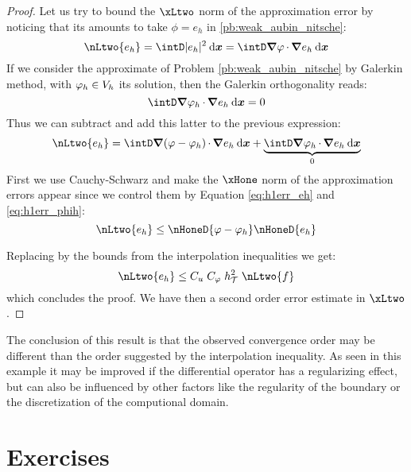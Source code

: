 \begin{proof}
\medskip
Let us try to bound the $\xLtwo$ norm of the approximation error by noticing that its amounts to take $\phi = e_h$ in \eqref{pb:weak_aubin_nitsche}:
\begin{equation*}
\nLtwo{e_h} = \intD |e_h|^2 \dxx = \intD \Grad \varphi\xDot \Grad e_h\dxx
\end{equation*}
If we consider the approximate of Problem \eqref{pb:weak_aubin_nitsche} by Galerkin method, with $\varphi_h \in {{V}}_h$ its solution, then the Galerkin orthogonality reads:
\begin{equation*}
\intD \Grad \varphi_h\xDot \Grad e_h\dxx  = 0
\end{equation*}
Thus we can subtract and add this latter to the previous expression:
\begin{equation*}
\nLtwo{e_h} = \intD \Grad (\varphi - \varphi_h)\xDot \Grad e_h\dxx + \underbrace{\intD \Grad \varphi_h\xDot \Grad e_h\dxx}_{0}
\end{equation*}
First we use Cauchy-Schwarz and make the $\xHone$ norm of the approximation errors appear since we control them by Equation \eqref{eq:h1err_eh} and \eqref{eq:h1err_phih}:
\begin{equation*}
\nLtwo{e_h} \leq \nHoneD{\varphi - \varphi_h} \nHoneD{e_h}
\end{equation*}

\medskip
Replacing by the bounds from the interpolation inequalities we get:
\begin{equation*}
\nLtwo{e_h} \leq C_u\;C_\varphi\;\sizeT^2\;\nLtwo{f}
\end{equation*}
which concludes the proof. We have then a second order error estimate in $\xLtwo$.
\end{proof}

The conclusion of this result is that the observed convergence order may be different than the order suggested by the interpolation inequality.
As seen in this example it may be improved if the differential operator has a regularizing effect, but can also be influenced by other factors like the regularity of the boundary or the discretization of the computional domain.

\newpage
\section{Exercises}


